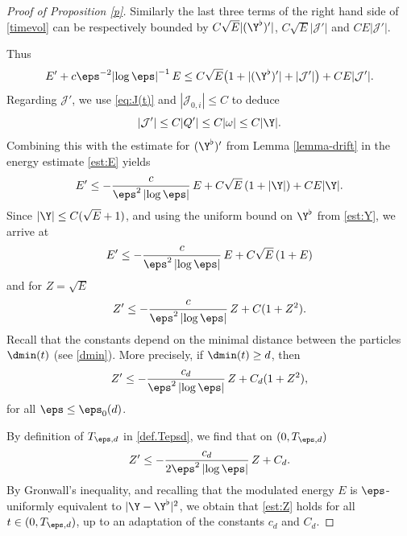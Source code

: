 \begin{proof}[Proof of Proposition \ref{p}]
Similarly the last three terms of the right hand side of \eqref{timevol} can be respectively bounded by
$C \sqrt E | (\Y^\flat)' |$, $C \sqrt E |\mathcal J'|$ and $ C E |\mathcal J'|$.

Thus
\begin{equation} \label{est:E}
E' + c {\eps^{-2}} {\left|\log \eps\right|^{-1}\,} E \leq C \sqrt E \bigl(1 + | (\Y^\flat)' | + |\mathcal J'|
\bigr) + C E |\mathcal J'|.
\end{equation}
Regarding $\mathcal J'$, we use \eqref{eq:J(t)} and $|\mathcal J_{0,i}| \leq C$ to deduce
\begin{equation}
|\mathcal J'| \leq C |Q'| \leq C | \omega| \leq C {\left| \Y \right|}.
\end{equation}
Combining this with the estimate for $(\Y^\flat)'$ from Lemma \ref{lemma-drift} in the energy estimate \eqref{est:E} yields
\begin{equation}
E' \leq - \frac{c}{\eps^2 \left|\log \eps\right|}\, E + C \sqrt E\, (1 + \left|
\Y
\right|) + C E {\left| \Y \right|}.
\end{equation}
Since
$ \left| \Y \right| \leq C (\sqrt E + 1)$,
and using the uniform bound on $\Y^\flat$ from \eqref{est:Y},
we arrive at
\begin{equation}
E' \leq - \frac{c}{\eps^2 \left|\log \eps\right|}\, E + C \sqrt E\, (1 + E)
\end{equation}
and for $Z = \sqrt E$
\begin{equation}
Z' \leq - \frac{c}{\eps^2 \left|\log \eps\right|}\, Z + C (1 + Z^2).
\end{equation}
Recall that the constants depend on the minimal distance between the particles $\dmin(t)$ (see \eqref{dmin}).
More precisely, if $\dmin(t) \geq d$, then
\begin{equation}
Z' \leq - \frac{c_d}{\eps^2 \left|\log \eps\right|}\, Z + C_d (1 + Z^2),
\end{equation}
for all $\eps \leq \eps_0(d)$.

By definition of $T_{\eps,d}$ in \eqref{def.Tepsd}, we find that on $(0,T_{\eps,d})$
\begin{equation}
Z' \leq - \frac{c_d}{2 \eps^2 \left|\log \eps\right|}\, Z + C_d.
\end{equation}
By Gronwall's inequality, and recalling that the modulated energy $E$ is $\eps$-uniformly equivalent to $\vert \Y - \Y^\flat \vert^2$,
we obtain that \eqref{est:Z} holds
for all $t \in (0,T_{\eps,d})$, up to an adaptation of the constants $c_d$ and $ C_d$.
\end{proof}

